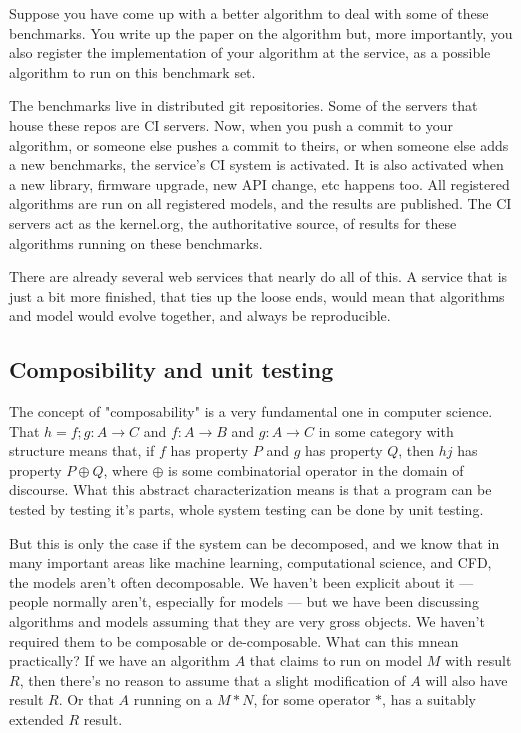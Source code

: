 \documentclass[conference]{IEEEtran}
\begin{document}
Suppose you have come up with a better algorithm to deal with some of
these benchmarks. You write up the paper on the algorithm but, more
importantly, you also register the implementation of your algorithm at
the service, as a possible algorithm to run on this benchmark set.

The benchmarks live in distributed git repositories. Some of the
servers that house these repos are CI servers. Now, when you push a
commit to your algorithm, or someone else pushes a commit to theirs,
or when someone else adds a new benchmarks, the service's CI system is
activated. It is also activated when a new library, firmware upgrade,
new API change, etc happens too. All registered algorithms are run on
all registered models, and the results are published. The CI servers
act as the kernel.org, the authoritative source, of results for these
algorithms running on these benchmarks.

There are already several web services that nearly do all of this. A
service that is just a bit more finished, that ties up the loose ends,
would mean that algorithms and model would evolve together, and always
be reproducible.

\subsection{Composibility and unit testing}


The concept of "composability" is a very fundamental one in computer science. 
That $h = f;g : A \rightarrow C$ and $f : A \rightarrow B$ and $g : A \rightarrow C$ 
in some category with structure means that, if $f$ has property $P$ and $g$ has
property $Q$, then $hj$ has property $P \oplus Q$, where $\oplus$ is some 
combinatorial operator in the domain of discourse. What this abstract 
characterization means is that a program can be tested by testing it's parts,
whole system testing can be done by unit testing. 

But this is only the case if the system can be decomposed, and we know that in
many important areas like machine learning, computational science, and CFD,
the models aren't often decomposable.  We haven't been explicit about it ---
people normally aren't, especially for models ---  but we have been discussing
algorithms and models assuming that they are very gross objects. We haven't
required them to be composable or de-composable. What can this mnean
practically? If we have an algorithm $A$ that claims to  run on model $M$ with
result $R$, then there's no reason to assume that a slight modification of $A$
will also have result $R$. Or that $A$ running on a $M * N$, for some operator
$*$, has a suitably extended $R$ result.
\end{document}
